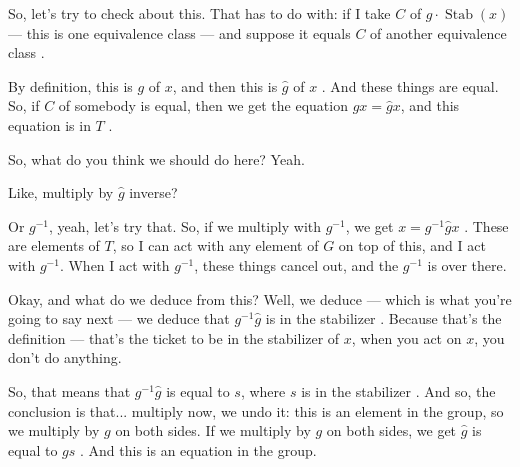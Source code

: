 \begin{proofWrapper}
\begin{speech}[00:30:08 - 00:31:04]
So, let's try to check about this. That has to do with: if I take $C$ of $g \cdot \operatorname{Stab}(x)$ --- this is one equivalence class --- and suppose it equals $C$ of another equivalence class .

By definition, this is $g$ of $x$, and then this is $\hat{g}$ of $x$ . And these things are equal. So, if $C$ of somebody is equal, then we get the equation $g x = \hat{g} x$, and this equation is in $T$ .

So, what do you think we should do here? Yeah.
\end{speech}

\begin{student}
Like, multiply by $\hat{g}$ inverse?
\end{student}

\begin{speech}[00:31:07 - 00:32:51]
Or $g^{-1}$, yeah, let's try that. So, if we multiply with $g^{-1}$, we get $x = g^{-1} \hat{g} x$ . These are elements of $T$, so I can act with any element of $G$ on top of this, and I act with $g^{-1}$. When I act with $g^{-1}$, these things cancel out, and the $g^{-1}$ is over there.

Okay, and what do we deduce from this? Well, we deduce --- which is what you're going to say next --- we deduce that $g^{-1} \hat{g}$ is in the stabilizer . Because that's the definition --- that's the ticket to be in the stabilizer of $x$, when you act on $x$, you don't do anything.

So, that means that $g^{-1} \hat{g}$ is equal to $s$, where $s$ is in the stabilizer . And so, the conclusion is that... multiply now, we undo it: this is an element in the group, so we multiply by $g$ on both sides. If we multiply by $g$ on both sides, we get $\hat{g}$ is equal to $g s$ . And this is an equation in the group.


\end{speech}
\end{proofWrapper}
